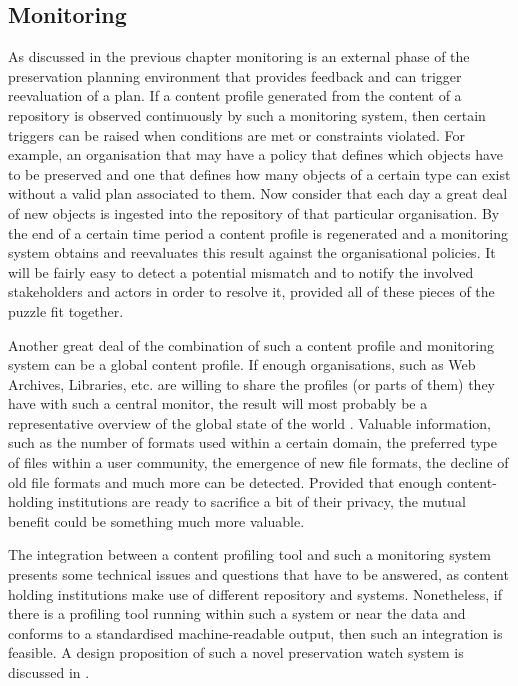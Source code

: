 \subsection{Monitoring}
As discussed in the previous chapter monitoring is an external phase of the preservation planning environment that provides feedback and can trigger reevaluation of a plan. If a content profile generated from the content of a repository is observed continuously by such a monitoring system, then certain triggers can be raised when conditions are met or constraints violated.
For example, an organisation that may have a policy that defines which objects have to be preserved and one that defines how many objects of a certain type can exist without a valid plan associated to them. Now consider that each day a great deal of new objects is ingested into the repository of that particular organisation. By the end of a certain time period a content profile is regenerated and a monitoring system obtains and reevaluates this result against the organisational policies. It will be fairly easy to detect a potential mismatch and to notify the involved stakeholders and actors in order to resolve it, provided all of these pieces of the puzzle fit together.

Another great deal of the combination of such a content profile and monitoring system can be a global content profile. If enough organisations, such as Web Archives, Libraries, etc. are willing to share the profiles (or parts of them) they have with such a central monitor, the result will most probably be a representative overview of the global state of the world \cite{becker-ipres2012}. Valuable information, such as the number of formats used within a certain domain, the preferred type of files within a user community, the emergence of new file formats, the decline of old file formats and much more can be detected. Provided that enough content-holding institutions are ready to sacrifice a bit of their privacy, the mutual benefit could be something much more valuable.

The integration between a content profiling tool and such a monitoring system presents some technical issues and questions that have to be answered, as content holding institutions make use of different repository and systems. Nonetheless, if there is a profiling tool running within such a system or near the data and conforms to a standardised machine-readable output, then such an integration is feasible. A design proposition of such a novel preservation watch system is discussed in \cite{duretec:2012:watch, FariaPDBFR12}.


